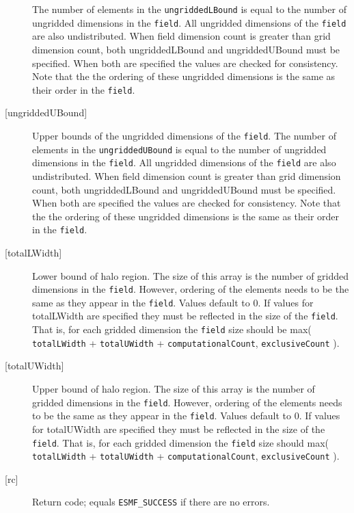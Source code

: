 \begin{description}
   The number of elements in the {\tt ungriddedLBound} is equal to the number of ungridded 
   dimensions in the {\tt field}. All ungridded dimensions of the 
   {\tt field} are also undistributed. When field dimension count is 
   greater than grid dimension count, both ungriddedLBound and ungriddedUBound 
   must be specified. When both are specified the values are checked 
   for consistency. Note that the the ordering of 
   these ungridded dimensions is the same as their order in the {\tt field}. 
   \item [{[ungriddedUBound]}] 
   Upper bounds of the ungridded dimensions of the {\tt field}. 
   The number of elements in the {\tt ungriddedUBound} is equal to the number of ungridded 
   dimensions in the {\tt field}. All ungridded dimensions of the 
   {\tt field} are also undistributed. When field dimension count is 
   greater than grid dimension count, both ungriddedLBound and ungriddedUBound 
   must be specified. When both are specified the values are checked 
   for consistency. Note that the the ordering of 
   these ungridded dimensions is the same as their order in the {\tt field}. 
   \item [{[totalLWidth]}] 
   Lower bound of halo region. The size of this array is the number 
   of gridded dimensions in the {\tt field}. However, ordering of the elements 
   needs to be the same as they appear in the {\tt field}. Values default 
   to 0. If values for totalLWidth are specified they must be reflected in 
   the size of the {\tt field}. That is, for each gridded dimension the 
   {\tt field} size should be max( {\tt totalLWidth} + {\tt totalUWidth} 
   + {\tt computationalCount}, {\tt exclusiveCount} ). 
   \item [{[totalUWidth]}] 
   Upper bound of halo region. The size of this array is the number 
   of gridded dimensions in the {\tt field}. However, ordering of the elements 
   needs to be the same as they appear in the {\tt field}. Values default 
   to 0. If values for totalUWidth are specified they must be reflected in 
   the size of the {\tt field}. That is, for each gridded dimension the 
   {\tt field} size should max( {\tt totalLWidth} + {\tt totalUWidth} 
   + {\tt computationalCount}, {\tt exclusiveCount} ). 
   \item [{[rc]}] 
   Return code; equals {\tt ESMF\_SUCCESS} if there are no errors. 
   \end{description} 
    
 
